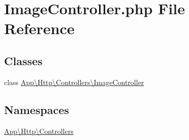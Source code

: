 \hypertarget{_image_controller_8php}{}\section{Image\+Controller.\+php File Reference}
\label{_image_controller_8php}
\subsection*{Classes}
\begin{DoxyCompactItemize}
\item 
class \mbox{\hyperlink{class_app_1_1_http_1_1_controllers_1_1_image_controller}{App\textbackslash{}\+Http\textbackslash{}\+Controllers\textbackslash{}\+Image\+Controller}}
\end{DoxyCompactItemize}
\subsection*{Namespaces}
\begin{DoxyCompactItemize}
\item 
 \mbox{\hyperlink{namespace_app_1_1_http_1_1_controllers}{App\textbackslash{}\+Http\textbackslash{}\+Controllers}}
\end{DoxyCompactItemize}

